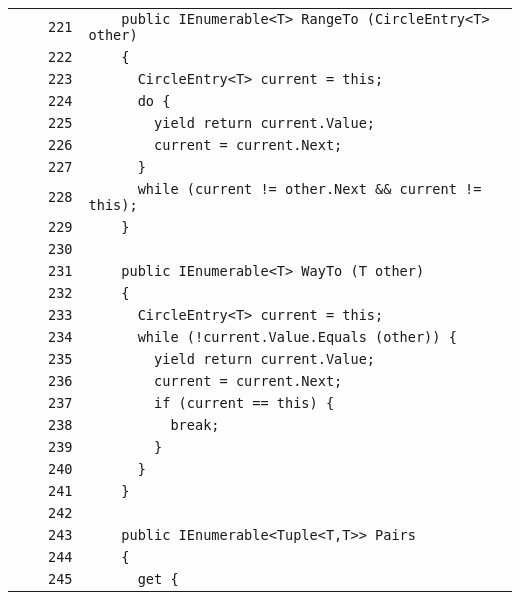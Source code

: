 \documentclass[a4paper,10pt]{article}
\begin{document}
\begin{longtable}[l]{lrrl}
\cellcolor{gray} &  & \verb~221~ & \verb~    public IEnumerable<T> RangeTo (CircleEntry<T> other)~\\
\cellcolor{gray} &  & \verb~222~ & \verb~    {~\\
\cellcolor{gray} &  & \verb~223~ & \verb~      CircleEntry<T> current = this;~\\
\cellcolor{gray} &  & \verb~224~ & \verb~      do {~\\
\cellcolor{gray} &  & \verb~225~ & \verb~        yield return current.Value;~\\
\cellcolor{gray} &  & \verb~226~ & \verb~        current = current.Next;~\\
\cellcolor{gray} &  & \verb~227~ & \verb~      }~\\
\cellcolor{gray} &  & \verb~228~ & \verb~      while (current != other.Next && current != this);~\\
\cellcolor{gray} &  & \verb~229~ & \verb~    }~\\
\cellcolor{gray} &  & \verb~230~ & \verb~~\\
\cellcolor{gray} &  & \verb~231~ & \verb~    public IEnumerable<T> WayTo (T other)~\\
\cellcolor{gray} &  & \verb~232~ & \verb~    {~\\
\cellcolor{gray} &  & \verb~233~ & \verb~      CircleEntry<T> current = this;~\\
\cellcolor{gray} &  & \verb~234~ & \verb~      while (!current.Value.Equals (other)) {~\\
\cellcolor{gray} &  & \verb~235~ & \verb~        yield return current.Value;~\\
\cellcolor{gray} &  & \verb~236~ & \verb~        current = current.Next;~\\
\cellcolor{gray} &  & \verb~237~ & \verb~        if (current == this) {~\\
\cellcolor{gray} &  & \verb~238~ & \verb~          break;~\\
\cellcolor{gray} &  & \verb~239~ & \verb~        }~\\
\cellcolor{gray} &  & \verb~240~ & \verb~      }~\\
\cellcolor{gray} &  & \verb~241~ & \verb~    }~\\
\cellcolor{gray} &  & \verb~242~ & \verb~~\\
\cellcolor{gray} &  & \verb~243~ & \verb~    public IEnumerable<Tuple<T,T>> Pairs~\\
\cellcolor{gray} &  & \verb~244~ & \verb~    {~\\
\cellcolor{gray} &  & \verb~245~ & \verb~      get {~\\

\end{longtable}
\end{document}
